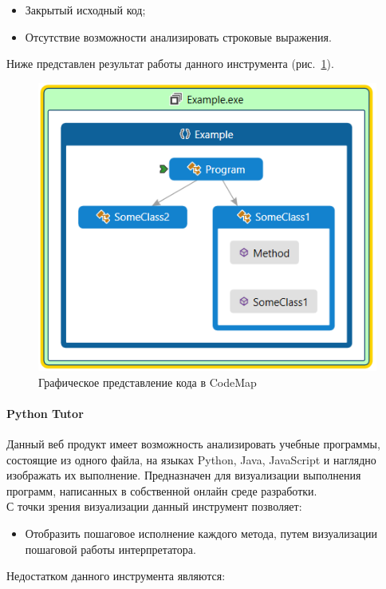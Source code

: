 \documentclass{matmex-diploma}
\begin{document}
\begin{itemize}

        \item { Закрытый исходный код; }
        \item { Отсутствие возможности анализировать строковые выражения. }
        
 \end{itemize}

Ниже представлен результат работы данного инструмента (рис.~\ref{CodeMap}).
\begin{figure}[h]
\label{CodeMap}
\centering
\includegraphics{CodeMap.PNG}
\caption{Графическое представление кода в CodeMap}
\end{figure}


\paragraph {Python Tutor}
Данный веб продукт имеет возможность анализировать учебные программы, состоящие из одного файла, на языках Python, Java, JavaScript и наглядно изображать их выполнение. Предназначен для визуализации выполнения программ, написанных в собственной онлайн среде разработки.  \\
С точки зрения визуализации данный инструмент позволяет:

\begin{itemize}

        \item { Отобразить пошаговое исполнение каждого метода, путем визуализации пошаговой работы интерпретатора. }
        
 \end{itemize}
Недостатком данного инструмента являются:
\end{document}
